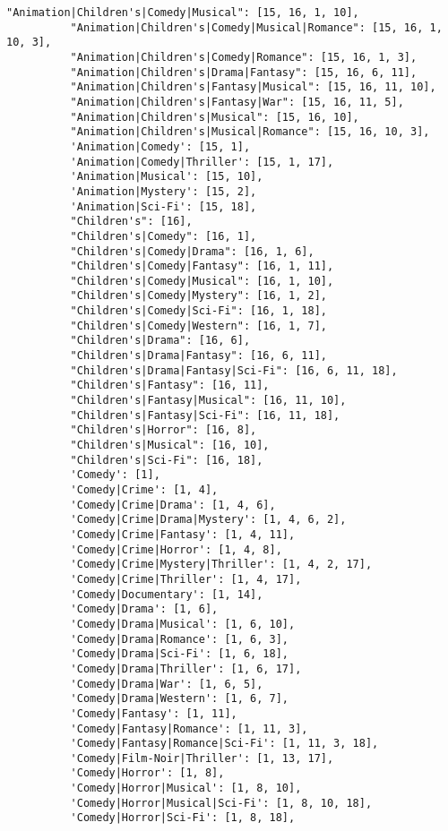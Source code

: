 \documentclass[11pt]{article}
\begin{document}
\begin{Verbatim}[commandchars=\\\{\}]
          "Animation|Children's|Comedy|Musical": [15, 16, 1, 10],
          "Animation|Children's|Comedy|Musical|Romance": [15, 16, 1, 10, 3],
          "Animation|Children's|Comedy|Romance": [15, 16, 1, 3],
          "Animation|Children's|Drama|Fantasy": [15, 16, 6, 11],
          "Animation|Children's|Fantasy|Musical": [15, 16, 11, 10],
          "Animation|Children's|Fantasy|War": [15, 16, 11, 5],
          "Animation|Children's|Musical": [15, 16, 10],
          "Animation|Children's|Musical|Romance": [15, 16, 10, 3],
          'Animation|Comedy': [15, 1],
          'Animation|Comedy|Thriller': [15, 1, 17],
          'Animation|Musical': [15, 10],
          'Animation|Mystery': [15, 2],
          'Animation|Sci-Fi': [15, 18],
          "Children's": [16],
          "Children's|Comedy": [16, 1],
          "Children's|Comedy|Drama": [16, 1, 6],
          "Children's|Comedy|Fantasy": [16, 1, 11],
          "Children's|Comedy|Musical": [16, 1, 10],
          "Children's|Comedy|Mystery": [16, 1, 2],
          "Children's|Comedy|Sci-Fi": [16, 1, 18],
          "Children's|Comedy|Western": [16, 1, 7],
          "Children's|Drama": [16, 6],
          "Children's|Drama|Fantasy": [16, 6, 11],
          "Children's|Drama|Fantasy|Sci-Fi": [16, 6, 11, 18],
          "Children's|Fantasy": [16, 11],
          "Children's|Fantasy|Musical": [16, 11, 10],
          "Children's|Fantasy|Sci-Fi": [16, 11, 18],
          "Children's|Horror": [16, 8],
          "Children's|Musical": [16, 10],
          "Children's|Sci-Fi": [16, 18],
          'Comedy': [1],
          'Comedy|Crime': [1, 4],
          'Comedy|Crime|Drama': [1, 4, 6],
          'Comedy|Crime|Drama|Mystery': [1, 4, 6, 2],
          'Comedy|Crime|Fantasy': [1, 4, 11],
          'Comedy|Crime|Horror': [1, 4, 8],
          'Comedy|Crime|Mystery|Thriller': [1, 4, 2, 17],
          'Comedy|Crime|Thriller': [1, 4, 17],
          'Comedy|Documentary': [1, 14],
          'Comedy|Drama': [1, 6],
          'Comedy|Drama|Musical': [1, 6, 10],
          'Comedy|Drama|Romance': [1, 6, 3],
          'Comedy|Drama|Sci-Fi': [1, 6, 18],
          'Comedy|Drama|Thriller': [1, 6, 17],
          'Comedy|Drama|War': [1, 6, 5],
          'Comedy|Drama|Western': [1, 6, 7],
          'Comedy|Fantasy': [1, 11],
          'Comedy|Fantasy|Romance': [1, 11, 3],
          'Comedy|Fantasy|Romance|Sci-Fi': [1, 11, 3, 18],
          'Comedy|Film-Noir|Thriller': [1, 13, 17],
          'Comedy|Horror': [1, 8],
          'Comedy|Horror|Musical': [1, 8, 10],
          'Comedy|Horror|Musical|Sci-Fi': [1, 8, 10, 18],
          'Comedy|Horror|Sci-Fi': [1, 8, 18],

\end{Verbatim}
\end{document}
